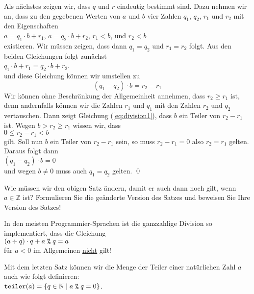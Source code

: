 Als n\"{a}chstes zeigen wir, dass $q$ und $r$ eindeutig bestimmt sind.  Dazu nehmen wir an,
dass zu den gegebenen Werten von $a$ und $b$ vier Zahlen $q_1$, $q_2$, $r_1$ und $r_2$ mit den
Eigenschaften 
\\[0.2cm]
\hspace*{1.3cm}
$a = q_1 \cdot b + r_1$, \quad
$a = q_2 \cdot b + r_2$, \quad 
$r_1 < b$, \quad und \quad $r_2 < b$
\\[0.2cm]
existieren.  Wir m\"{u}ssen zeigen, dass dann $q_1 = q_2$ und $r_1 = r_2$ folgt.  Aus den beiden
Gleichungen folgt zun\"{a}chst
\\[0.2cm]
\hspace*{1.3cm}
$q_1 \cdot b + r_1 = q_2 \cdot b + r_2$.
\\[0.2cm]
und diese Gleichung k\"{o}nnen wir umstellen zu
\begin{equation}
  \label{eq:division1}
  (q_1 - q_2) \cdot b = r_2 - r_1  
\end{equation}
Wir k\"{o}nnen  ohne Beschr\"{a}nkung der Allgemeinheit annehmen, dass $r_2 \geq r_1$ ist, denn andernfalls
k\"{o}nnen wir die Zahlen $r_1$ und $q_1$ mit den Zahlen $r_2$ und $q_2$ vertauschen.  Dann zeigt
Gleichung (\ref{eq:division1}), dass $b$ ein Teiler von $r_2 - r_1$ ist.  Wegen $b > r_2 \geq r_1$ 
wissen wir, dass
\\[0.2cm]
\hspace*{1.3cm}
$0 \leq r_2 - r_1 < b$
\\[0.2cm]
gilt.  Soll nun $b$ ein Teiler von $r_2 - r_1$ sein, so muss $r_2 - r_1 = 0$ also $r_2 = r_1$
gelten.  Daraus folgt dann
\\
\hspace*{1.3cm}
$(q_1 - q_2) \cdot b = 0$  
\\[0.2cm]
und wegen $b \not= 0$ muss auch $q_1 = q_2$ gelten. 
\qed

\exercise
Wie m\"{u}ssen wir den obigen Satz \"{a}ndern, damit er auch dann noch gilt, wenn  $a \in \mathbb{Z}$ ist?
Formulieren Sie die ge\"{a}nderte Version des Satzes und beweisen Sie Ihre Version des Satzes!

\remark
In den meisten Programmier-Sprachen ist die ganzzahlige Division so implementiert, dass
die Gleichung 
\\[0.2cm]
\hspace*{1.3cm}
$(a \div q) \cdot q + a \;\texttt{\%}\; q = a$
\\[0.2cm]
f\"{u}r $a < 0$ im Allgemeinen \underline{nicht} gilt!

\vspace*{0.3cm}
\noindent
Mit dem letzten Satz k\"{o}nnen wir die Menge der Teiler einer nat\"{u}rlichen Zahl $a$ auch wie folgt definieren:
\\[0.2cm]
\hspace*{1.3cm}
$\texttt{teiler}(a) = \{ q \in \mathbb{N} \mid a \;\texttt{\%}\; q = 0 \}$.
\vspace*{0.3cm}


